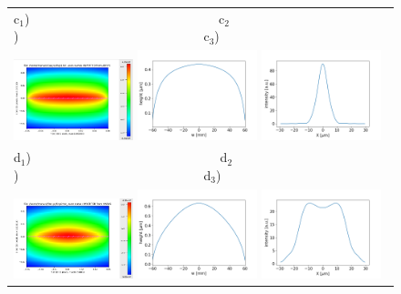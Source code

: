 \documentclass{iucr}              %
\begin{document}
\begin{figure}
\begin{center}
\begin{tabular}{l}
   c$_1$)~~~~~~~~~~~~~~~~~~~~~~~~~~~~~
   c$_2$)~~~~~~~~~~~~~~~~~~~~~~~~~~~~~c$_3$)\\ 
   \includegraphics[width=0.32\textwidth]{figures/water1_2d.png}
   \includegraphics[width=0.32\textwidth]{figures/deformationwater1_1d.png}   
   \includegraphics[width=0.32\textwidth]{figures/intensitywater1.png} \\

   
   d$_1$)~~~~~~~~~~~~~~~~~~~~~~~~~~~~~
   d$_2$)~~~~~~~~~~~~~~~~~~~~~~~~~~~~~d$_3$)\\
   \includegraphics[width=0.32\textwidth]{figures/water2_2d.png} 
   \includegraphics[width=0.32\textwidth]{figures/deformationwater2_1d.png} 
   \includegraphics[width=0.32\textwidth]{figures/intensitywater2.png}\\
   

\end{tabular}
\end{center}
\end{figure}
\end{document}
